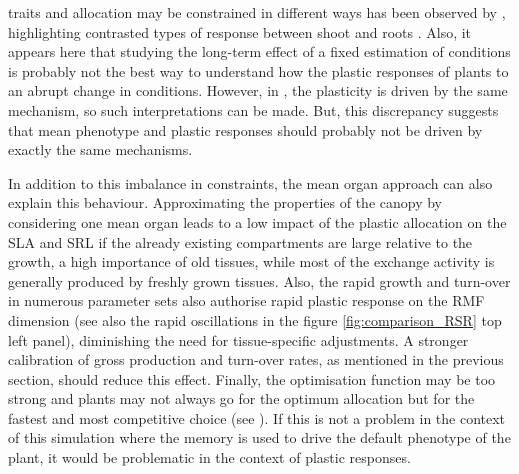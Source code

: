 traits and allocation may be constrained in different ways has been observed by \cite{freschet_integrated_2015}, highlighting contrasted types of response between shoot and roots \parencite{poorter_limits_2015}. Also, it appears here that studying the long-term effect of a fixed estimation of conditions is probably not the best way to understand how the plastic responses of plants to an abrupt change in conditions. However, in \model , the plasticity is driven by the same mechanism, so such interpretations can be made. But, this discrepancy suggests that mean phenotype and plastic responses should probably not be driven by exactly the same mechanisms.

In addition to this imbalance in constraints, the mean organ approach can also explain this behaviour. Approximating the properties of the canopy by considering one mean organ leads to a low impact of the plastic allocation on the SLA and SRL if the already existing compartments are large relative to the growth, a high importance of old tissues, while most of the exchange activity is generally produced by freshly grown tissues. Also, the rapid growth and turn-over in numerous parameter sets also authorise rapid plastic response on the RMF dimension (see also the rapid oscillations in the figure \ref{fig:comparison_RSR} top left panel), diminishing the need for tissue-specific adjustments. A stronger calibration of gross production and turn-over rates, as mentioned in the previous section, should reduce this effect. Finally, the optimisation function may be too strong and plants may not always go for the optimum allocation but for the fastest and most competitive choice (see \cite{farrior_resource_2011,dybzinski_evolutionarily_2011, farrior_competitive_2014}). If this is not a problem in the context of this simulation where the memory is used to drive the default phenotype of the plant, it would be problematic in the context of plastic responses.
%




%
%
%



